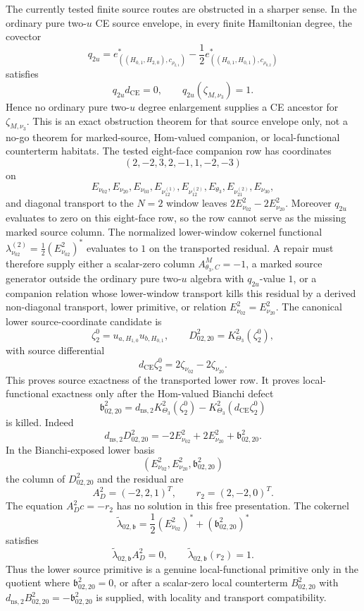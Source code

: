 \documentclass[11pt]{memoir}
\begin{document}
\begin{prop}
  The currently tested finite source routes are obstructed in a sharper
  sense.  In the ordinary pure two-\(u\) CE source envelope, in every
  finite Hamiltonian degree, the covector
  \[
    q_{2u}
    =
    e^*_{((H_{0,1},H_{2,0}),c_{\rho_{2,1}})}
    -\frac12
    e^*_{((H_{0,1},H_{0,1}),c_{\rho_{0,2}})}
  \]
  satisfies
  \[
    q_{2u}d_{\mathrm{CE}}=0,\qquad
    q_{2u}(\zeta_{M,\nu_3})=1.
  \]
  Hence no ordinary pure two-\(u\) degree enlargement supplies a CE
  ancestor for \(\zeta_{M,\nu_3}\).  This is an exact obstruction theorem
  for that source envelope only, not a no-go theorem for marked-source,
  Hom-valued companion, or local-functional counterterm habitats.  The
  tested eight-face companion row has coordinates
  \[
    (2,-2,3,2,-1,1,-2,-3)
  \]
  on
  \[
    E_{\nu_{02}},E_{\nu_{20}},E_{\nu_{03}},
    E_{\nu_{12}^{(1)}},E_{\nu_{12}^{(2)}},
    E_{\theta_3},E_{\nu_{21}^{(2)}},E_{\nu_{30}},
  \]
  and diagonal transport to the \(N=2\) window leaves
  \(2E^2_{\nu_{02}}-2E^2_{\nu_{20}}\).  Moreover
  \(q_{2u}\) evaluates to zero on this eight-face row, so the row cannot
  serve as the missing marked source column.  The normalized lower-window
  cokernel functional
  \(\lambda^{(2)}_{\nu_{02}}=\frac12(E^2_{\nu_{02}})^*\) evaluates to
  \(1\) on the transported residual.  A repair must therefore supply
  either a scalar-zero column \(A^M_{\theta_3,C}=-1\), a marked source
  generator outside the ordinary pure two-\(u\) algebra with
  \(q_{2u}\)-value \(1\), or a companion relation whose lower-window
  transport kills this residual by a derived non-diagonal transport,
  lower primitive, or relation \(E^2_{\nu_{02}}=E^2_{\nu_{20}}\).  The
  canonical lower source-coordinate candidate is
  \[
    \zeta^0_2=u_{a,H_{1,0}}u_{b,H_{0,1}},
    \qquad
    D^2_{02,20}
    =
    K^2_{\Theta_3}(\zeta^0_2),
  \]
  with source differential
  \[
    d_{\mathrm{CE}}\zeta^0_2
    =
    2\zeta_{\nu_{02}}-2\zeta_{\nu_{20}}.
  \]
  This proves source exactness of the transported lower row.  It proves
  local-functional exactness only after the Hom-valued Bianchi defect
  \[
    \mathfrak b^2_{02,20}
    =
    d_{\mathrm{ns},2}K^2_{\Theta_3}(\zeta^0_2)
    -
    K^2_{\Theta_3}(d_{\mathrm{CE}}\zeta^0_2)
  \]
  is killed.  Indeed
  \[
    d_{\mathrm{ns},2}D^2_{02,20}
    =
    -2E^2_{\nu_{02}}+2E^2_{\nu_{20}}
    +\mathfrak b^2_{02,20}.
  \]
  In the Bianchi-exposed lower basis
  \[
    (E^2_{\nu_{02}},E^2_{\nu_{20}},\mathfrak b^2_{02,20})
  \]
  the column of \(D^2_{02,20}\) and the residual are
  \[
    A_D^2=(-2,2,1)^T,\qquad r_2=(2,-2,0)^T .
  \]
  The equation \(A_D^2c=-r_2\) has no solution in this free
  presentation.  The cokernel
  \[
    \widetilde\lambda_{02,\mathfrak b}
    =
    \frac12(E^2_{\nu_{02}})^*
    +(\mathfrak b^2_{02,20})^*
  \]
  satisfies
  \[
    \widetilde\lambda_{02,\mathfrak b}A_D^2=0,\qquad
    \widetilde\lambda_{02,\mathfrak b}(r_2)=1.
  \]
  Thus the lower source primitive is a genuine local-functional primitive
  only in the quotient where \(\mathfrak b^2_{02,20}=0\), or after a
  scalar-zero local counterterm \(B^2_{02,20}\) with
  \(d_{\mathrm{ns},2}B^2_{02,20}=-\mathfrak b^2_{02,20}\) is supplied,
  with locality and transport compatibility.


\end{prop}
\end{document}
